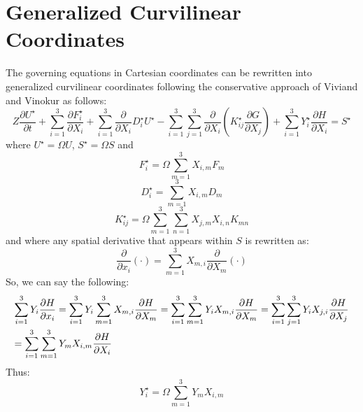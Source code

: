 \documentclass{warpdoc}
\newcommand{\alb}{\vspace{0.1cm}\\} %
\newcommand{\mfd}{\displaystyle}
\begin{document}
\section{Generalized Curvilinear Coordinates}

The governing equations in Cartesian coordinates can be rewritten into generalized curvilinear coordinates following the conservative approach of Viviand \cite{misc:1974:viviand} and Vinokur \cite{jcp:1974:vinokur} as follows:
%
\begin{equation}
   Z\frac{\partial U^\star}{\partial t} + \sum_{i=1}^3 \frac{\partial F_i^\star}{\partial X_i} 
     + \sum_{i=1}^3 \frac{\partial }{\partial X_i} D_i^\star U^\star
     - \sum_{i=1}^3 \sum_{j=1}^3 \frac{\partial }{\partial X_i}\left( K_{ij}^\star \frac{\partial G}{\partial X_j} \right)
     +\sum_{i=1}^3 Y_i^\star \frac{\partial H}{\partial X_i}  
=
S^\star
\end{equation}
%
where  $U^\star=\Omega U$, $S^\star=\Omega S$ and
%
\begin{equation}
 F_i^\star=\Omega \sum_{m=1}^3 X_{i,m} F_m
\end{equation}
%
%
\begin{equation}
 D_i^\star= \sum_{m=1}^3 X_{i,m} D_m
\end{equation}
%
%
\begin{equation}
 K_{ij}^\star=\Omega \sum_{m=1}^3 \sum_{n=1}^3 X_{j,m} X_{i,n} K_{mn}
\end{equation}
%
and where any spatial derivative that appears within $S$ is rewritten as:
%
\begin{equation}
 \frac{\partial}{\partial x_i}\left( \cdot \right) = \sum_{m=1}^3 X_{m,i} \frac{\partial}{\partial X_m}\left( \cdot \right)
\end{equation}
%
So, we can say the following:
%
\begin{equation}
\begin{array}{l}\mfd
\sum_{i=1}^3 Y_i \frac{\partial H}{\partial x_i}
=
\sum_{i=1}^3 Y_i \sum_{m=1}^3 X_{m,i} \frac{\partial H}{\partial X_m}
=
\sum_{i=1}^3  \sum_{m=1}^3 Y_i X_{m,i} \frac{\partial H}{\partial X_m}
=
\sum_{i=1}^3  \sum_{j=1}^3 Y_i X_{j,i} \frac{\partial H}{\partial X_j}
\alb\mfd=
  \sum_{i=1}^3 \sum_{m=1}^3 Y_m X_{i,m} \frac{\partial H}{\partial X_i}
\end{array}
\end{equation}
%
Thus:
%
\begin{equation}
 Y^\star_i = \Omega \sum_{m=1}^3 Y_m X_{i,m}
\end{equation}
%
\end{document}
